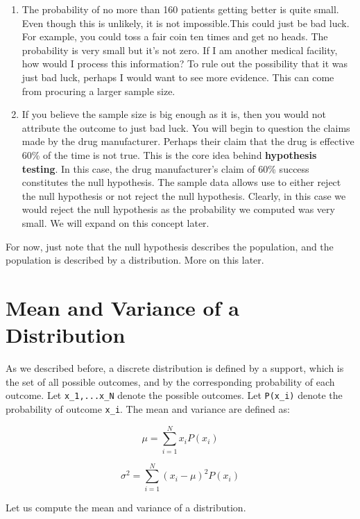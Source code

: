 \documentclass[
]{article}
\begin{document}
\begin{enumerate}
\def\labelenumi{\arabic{enumi}.}
\item
  The probability of no more than 160 patients getting better is quite
  small. Even though this is unlikely, it is not impossible.This could
  just be bad luck. For example, you could toss a fair coin ten times
  and get no heads. The probability is very small but it's not zero. If
  I am another medical facility, how would I process this information?
  To rule out the possibility that it was just bad luck, perhaps I would
  want to see more evidence. This can come from procuring a larger
  sample size.
\item
  If you believe the sample size is big enough as it is, then you would
  not attribute the outcome to just bad luck. You will begin to question
  the claims made by the drug manufacturer. Perhaps their claim that the
  drug is effective 60\% of the time is not true. This is the core idea
  behind \textbf{hypothesis testing}. In this case, the drug
  manufacturer's claim of 60\% success constitutes the null hypothesis.
  The sample data allows use to either reject the null hypothesis or not
  reject the null hypothesis. Clearly, in this case we would reject the
  null hypothesis as the probability we computed was very small. We will
  expand on this concept later.
\end{enumerate}

For now, just note that the null hypothesis describes the population,
and the population is described by a distribution. More on this later.

\hypertarget{mean-and-variance-of-a-distribution}{%
\section{Mean and Variance of a
Distribution}\label{mean-and-variance-of-a-distribution}}

As we described before, a discrete distribution is defined by a support,
which is the set of all possible outcomes, and by the corresponding
probability of each outcome. Let \texttt{x\_1,...x\_N} denote the
possible outcomes. Let \texttt{P(x\_i)} denote the probability of
outcome \texttt{x\_i}. The mean and variance are defined as:

\[\mu=\sum_{i = 1}^{N} x_i P(x_i)\]

\[\sigma^2 = \sum_{i = 1}^{N} (x_i - \mu)^2P(x_i)\]

Let us compute the mean and variance of a distribution.
\end{document}
